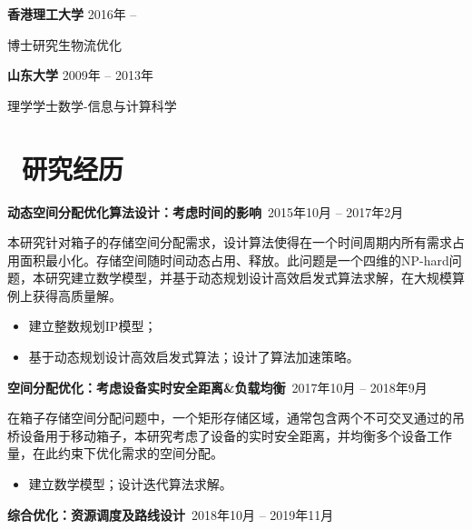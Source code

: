 \documentclass[11pt]{article}
\begin{document}
\textbf{香港理工大学} \hfill 2016年 -- 

博士研究生\quad 物流优化

\textbf{山东大学} \hfill 2009年 -- 2013年

理学学士\quad 数学-信息与计算科学


\section{\makebox[\widthof{\faGraduationCap}][c]{\color{CVBlue}\faLightbulbO}\ 研究经历}
\textbf{动态空间分配优化算法设计：考虑时间的影响}\  \hfill 2015年10月 -- 2017年2月

本研究针对箱子的存储空间分配需求，设计算法使得在一个时间周期内所有需求占用面积最小化。存储空间随时间动态占用、释放。此问题是一个四维的NP-hard问题，本研究建立数学模型，并基于动态规划设计高效启发式算法求解，在大规模算例上获得高质量解。

\begin{itemize}
  \item 建立整数规划IP模型；
  \item 基于动态规划设计高效启发式算法；设计了算法加速策略。
\end{itemize}

\textbf{空间分配优化：考虑设备实时安全距离\&负载均衡}\  \hfill 2017年10月 -- 2018年9月

在箱子存储空间分配问题中，一个矩形存储区域，通常包含两个不可交叉通过的吊桥设备用于移动箱子，本研究考虑了设备的实时安全距离，并均衡多个设备工作量，在此约束下优化需求的空间分配。
\begin{itemize}
  \item 建立数学模型；设计迭代算法求解。
\end{itemize}

\textbf{综合优化：资源调度及路线设计}\  \hfill 2018年10月 -- 2019年11月
\end{document}
